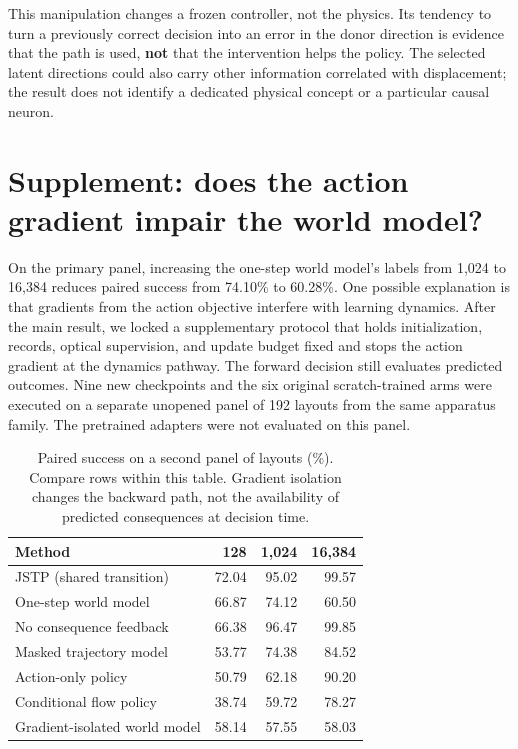 \documentclass[11pt]{article}
\begin{document}
This manipulation changes a frozen controller, not the physics. Its tendency to turn a previously correct decision into an error in the donor direction is evidence that the path is used, \textbf{not} that the intervention helps the policy. The selected latent directions could also carry other information correlated with displacement; the result does not identify a dedicated physical concept or a particular causal neuron.

\FloatBarrier\section{Supplement: does the action gradient impair the world model?}

On the primary panel, increasing the one-step world model's labels from 1,024 to 16,384 reduces paired success from 74.10\% to 60.28\%. One possible explanation is that gradients from the action objective interfere with learning dynamics. After the main result, we locked a supplementary protocol that holds initialization, records, optical supervision, and update budget fixed and stops the action gradient at the dynamics pathway. The forward decision still evaluates predicted outcomes. Nine new checkpoints and the six original scratch-trained arms were executed on a separate unopened panel of 192 layouts from the same apparatus family. The pretrained adapters were not evaluated on this panel.

\begin{table}[htbp]
\centering\small\setlength{\tabcolsep}{3.5pt}
\caption{Paired success on a second panel of layouts (\%). Compare rows within this table. Gradient isolation changes the backward path, not the availability of predicted consequences at decision time.}
\label{tab:4}
\begin{tabularx}{\linewidth}{@{}>{\raggedright\arraybackslash}Xrrr@{}}
\toprule
\textbf{Method} & \textbf{128} & \textbf{1,024} & \textbf{16,384} \\
\midrule
JSTP (shared transition) & 72.04 & 95.02 & 99.57 \\
One-step world model & 66.87 & 74.12 & 60.50 \\
No consequence feedback & 66.38 & 96.47 & 99.85 \\
Masked trajectory model & 53.77 & 74.38 & 84.52 \\
Action-only policy & 50.79 & 62.18 & 90.20 \\
Conditional flow policy & 38.74 & 59.72 & 78.27 \\
Gradient-isolated world model & 58.14 & 57.55 & 58.03 \\
\bottomrule
\end{tabularx}
\end{table}
\end{document}
